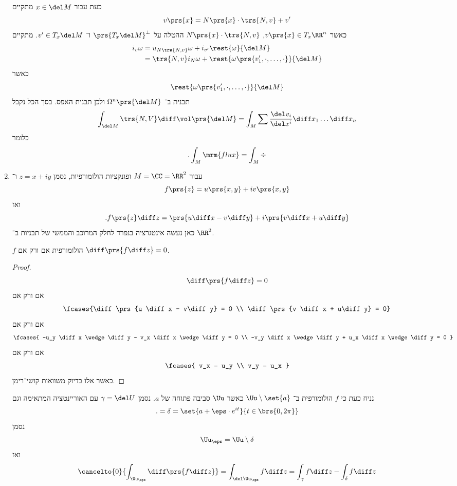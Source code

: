 \documentclass[a4paper,10pt,twoside,openany]{book}
\begin{document}
\begin{enumerate}
\begin{example}
כעת
עבור
$x \in \del M$
מתקיים
\[v\prs{x} = N\prs{x} \cdot \trs{N,v} + v'\]
כאשר
$v\prs{x} \in T_x \RR^n$,
$N\prs{x} \cdot \trs{N,v}$
ההטלה על
$\prs{T_x \del M}^{\perp}$
ו־%
$v' \in T_x \del M$.
מתקיים
\begin{align*}
i_v \omega &= u_{N \trs{N,v}} \omega + i_{v'} \rest{\omega}{\del M} \\&= \trs{N,v} i_N \omega + \rest{\omega\prs{v_1', \cdot, \ldots, \cdot}}{\del M}
\end{align*}
כאשר
\[\rest{\omega\prs{v_1', \cdot, \ldots, \cdot}}{\del M}\]
תבנית ב־%
$\Omega^n\prs{\del M}$
ולכן תבנית האפס.
בסך הכל נקבל
\begin{align*}
\int_{\del M} \trs{N,V} \diff \vol\prs{\del M} = \int_M \sum \frac{\del v_i}{\del x^i} \diff x_1 \ldots \diff x_n
\end{align*}
כלומר
\[\text{.} \int_M \mrm{flux} = \int_M \div\]
\end{example}
\item עבור
$M = \CC = \RR^2$
ופונקציות הולומורפיות, נסמן
$z = x+iy$
ו־%
\[f\prs{z} = u\prs{x,y} + iv\prs{x,y}\]
ואז
\[\text{.} f\prs{z} \diff z = \prs{u \diff x - v\diff y} + i\prs{v \diff x + u\diff y}\]
כאן נעשה אינטגרציה בנפרד לחלק המרוכב והממשי של תבניות ב־%
$\RR^2$.
\begin{proposition}
$f$
הולומורפית אם ורק אם
$\diff\prs{f \diff z} = 0$.
\end{proposition}
\begin{proof}
\[\diff \prs{f \diff z} = 0\]
אם ורק אם
\begin{align*}
\fcases{\diff \prs{u \diff x - v\diff y} = 0 \\
\diff \prs{v \diff x + u\diff y} = 0}
\end{align*}
אם ורק אם
\begin{align*}
\fcases{
-u_y \diff x \wedge \diff y - v_x \diff x \wedge \diff y = 0
\\
-v_y \diff x \wedge \diff y + u_x \diff x \wedge \diff y = 0
}
\end{align*}
אם ורק אם
\begin{align*}
\fcases{
v_x = u_y
\\
v_y = u_x
}
\end{align*}
כאשר אלו בדיוק משוואות קושי־רימן.
\end{proof}

נניח כעת כי
$f$
הולומורפית ב־%
$\Uu \setminus \set{a}$
כאשר
$\Uu$
סביבה פתוחה של
$a$.
נסמן
$\gamma = \del U$
עם האוריינטציה המתאימה וגם
\[\text{.} = \delta = \set{a + \eps \cdot e^{it}}{t \in \brs{0,2\pi}}\]
נסמן
\[\Uu_{\eps} = \Uu \setminus \delta\]
ואז
\begin{align*}
\cancelto{0}{\int_{\Uu_{\eps}} \diff \prs{f \diff z}} = \int_{\del \Uu_{\eps}} f\diff z = \int_{\gamma} f\diff z - \int_{\delta} f\diff z
\end{align*}


\end{enumerate}
\end{document}
